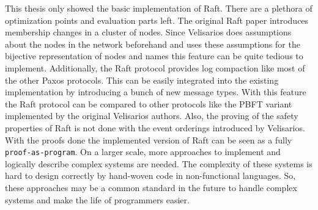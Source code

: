 This thesis only showed the basic implementation of
Raft. There are a plethora of optimization points
and evaluation parts left. The original Raft paper
introduces membership changes in a cluster of nodes.
Since Velisarios does assumptions about the nodes
in the network beforehand and uses these assumptions
for the bijective representation of nodes and names
this feature can be quite tedious to implement.
Additionally, the Raft protocol provides log
compaction like most of the other Paxos protocols.
This can be easily integrated into the existing
implementation by introducing a bunch of new message
types. With this feature the Raft protocol can be
compared to other protocols like the PBFT variant
implemented by the original Velisarios authors.
Also, the proving of the safety properties of
Raft is not done with the event orderings
introduced by Velisarios. With the proofs
done the implemented version of Raft
can be seen as a fully \texttt{proof-as-program}.
On a larger scale, more approaches to implement and
logically describe complex systems are needed. The
complexity of these systems is hard to design
correctly by hand-woven code in non-functional
languages. So, these approaches may be a common
standard in the future to handle complex systems
and make the life of programmers easier.




